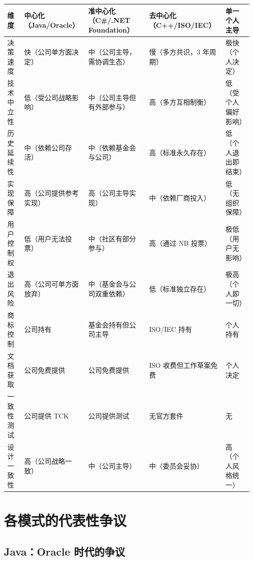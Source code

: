 \documentclass[12pt,a4paper,fontset=fandol]{ctexbook}
\begin{document}
\begin{center}
\scriptsize
\begin{tabular}{@{}>{\raggedright\arraybackslash}p{2.2cm} >{\raggedright\arraybackslash}p{2.6cm} >{\raggedright\arraybackslash}p{2.6cm} >{\raggedright\arraybackslash}p{2.6cm} >{\raggedright\arraybackslash}p{2.6cm}@{}}
\toprule
\textbf{维度} & \textbf{中心化（Java/Oracle）} & \textbf{准中心化（C\#/.NET Foundation）} & \textbf{去中心化（C++/ISO/IEC）} & \textbf{单一个人主导} \\
\midrule
决策速度 & 快（公司单方面决定） & 中（公司主导，需协调生态） & 慢（多方共识，3 年周期） & 极快（个人决定） \\
\addlinespace
技术中立性 & 低（受公司战略影响） & 中（公司主导但有外部参与） & 高（多方互相制衡） & 低（受个人偏好影响） \\
\addlinespace
历史延续性 & 中（依赖公司存活） & 中（依赖基金会与公司） & 高（标准永久存在） & 低（个人退出即结束） \\
\addlinespace
实现保障 & 高（公司提供参考实现） & 高（公司主导实现） & 中（依赖厂商投入） & 低（无组织保障） \\
\addlinespace
用户控制权 & 低（用户无法投票） & 中（社区有部分参与） & 高（通过 NB 投票） & 极低（用户无影响） \\
\addlinespace
退出风险 & 高（公司可单方面放弃） & 中（基金会与公司双重依赖） & 低（标准独立存在） & 极高（个人即一切） \\
\addlinespace
商标控制 & 公司持有 & 基金会持有但公司主导 & ISO/IEC 持有 & 个人持有 \\
\addlinespace
文档获取 & 公司免费提供 & 公司免费提供 & ISO 收费但工作草案免费 & 个人决定 \\
\addlinespace
一致性测试 & 公司提供 TCK & 公司提供测试 & 无官方套件 & 无 \\
\addlinespace
设计一致性 & 高（公司战略一致） & 中（公司主导） & 中（委员会妥协） & 高（个人风格统一） \\
\bottomrule
\end{tabular}
\end{center}

\section{各模式的代表性争议}

\subsection{Java：Oracle 时代的争议}
\end{document}
